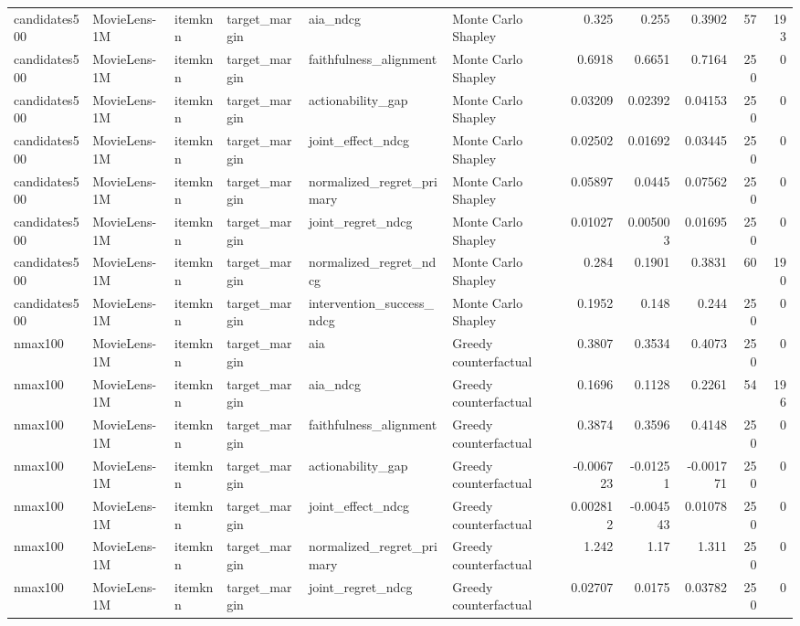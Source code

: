 \begin{table}[t]
{\begin{tabular}{llllllrrrrr}
candidates500 & MovieLens-1M & itemknn & target\_margin & aia\_ndcg & Monte Carlo Shapley & 0.325 & 0.255 & 0.3902 & 57 & 193 \\
candidates500 & MovieLens-1M & itemknn & target\_margin & faithfulness\_alignment & Monte Carlo Shapley & 0.6918 & 0.6651 & 0.7164 & 250 & 0 \\
candidates500 & MovieLens-1M & itemknn & target\_margin & actionability\_gap & Monte Carlo Shapley & 0.03209 & 0.02392 & 0.04153 & 250 & 0 \\
candidates500 & MovieLens-1M & itemknn & target\_margin & joint\_effect\_ndcg & Monte Carlo Shapley & 0.02502 & 0.01692 & 0.03445 & 250 & 0 \\
candidates500 & MovieLens-1M & itemknn & target\_margin & normalized\_regret\_primary & Monte Carlo Shapley & 0.05897 & 0.0445 & 0.07562 & 250 & 0 \\
candidates500 & MovieLens-1M & itemknn & target\_margin & joint\_regret\_ndcg & Monte Carlo Shapley & 0.01027 & 0.005003 & 0.01695 & 250 & 0 \\
candidates500 & MovieLens-1M & itemknn & target\_margin & normalized\_regret\_ndcg & Monte Carlo Shapley & 0.284 & 0.1901 & 0.3831 & 60 & 190 \\
candidates500 & MovieLens-1M & itemknn & target\_margin & intervention\_success\_ndcg & Monte Carlo Shapley & 0.1952 & 0.148 & 0.244 & 250 & 0 \\
nmax100 & MovieLens-1M & itemknn & target\_margin & aia & Greedy counterfactual & 0.3807 & 0.3534 & 0.4073 & 250 & 0 \\
nmax100 & MovieLens-1M & itemknn & target\_margin & aia\_ndcg & Greedy counterfactual & 0.1696 & 0.1128 & 0.2261 & 54 & 196 \\
nmax100 & MovieLens-1M & itemknn & target\_margin & faithfulness\_alignment & Greedy counterfactual & 0.3874 & 0.3596 & 0.4148 & 250 & 0 \\
nmax100 & MovieLens-1M & itemknn & target\_margin & actionability\_gap & Greedy counterfactual & -0.006723 & -0.01251 & -0.001771 & 250 & 0 \\
nmax100 & MovieLens-1M & itemknn & target\_margin & joint\_effect\_ndcg & Greedy counterfactual & 0.002812 & -0.004543 & 0.01078 & 250 & 0 \\
nmax100 & MovieLens-1M & itemknn & target\_margin & normalized\_regret\_primary & Greedy counterfactual & 1.242 & 1.17 & 1.311 & 250 & 0 \\
nmax100 & MovieLens-1M & itemknn & target\_margin & joint\_regret\_ndcg & Greedy counterfactual & 0.02707 & 0.0175 & 0.03782 & 250 & 0 \\

\end{tabular}}
\end{table}
